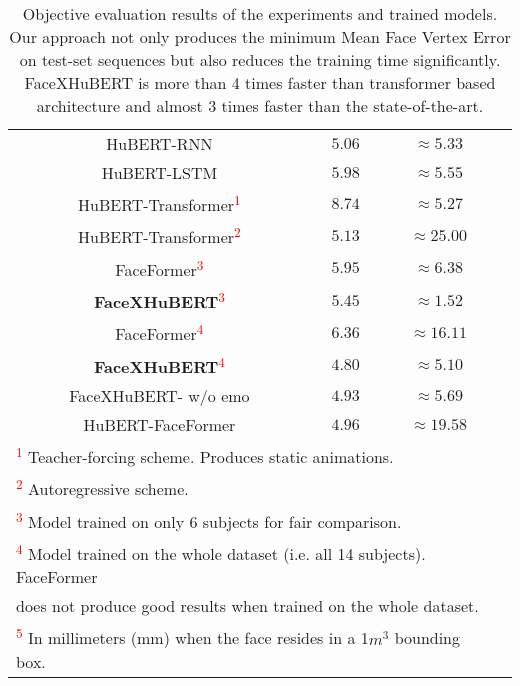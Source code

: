 \documentclass[10pt,twocolumn,letterpaper]{article}
\begin{document}
\begin{table}[t]
\begin{tabular}{c c c c}
    HuBERT-RNN & $5.06$ & $\approx5.33$\\
    HuBERT-LSTM &  $5.98$ & $\approx5.55$\\
    HuBERT-Transformer\textsuperscript{\textcolor{red}{1}} & $8.74$ & $\approx5.27$\\
    HuBERT-Transformer\textsuperscript{\textcolor{red}{2}} & $5.13$ & $\approx25.00$\\
    FaceFormer\textsuperscript{\textcolor{red}{3}} & $5.95$ & $\approx6.38$\\ \textbf{FaceXHuBERT}\textsuperscript{\textcolor{red}{3}} & $\mathbf{5.45}$ & $\mathbf{\approx1.52}$\\
    FaceFormer\textsuperscript{\textcolor{red}{4}} & $6.36$ & $\approx16.11$\\
    \textbf{FaceXHuBERT}\textsuperscript{\textcolor{red}{4}} & $\mathbf{4.80}$ & $\mathbf{\approx5.10}$\\
    FaceXHuBERT- w/o emo & $4.93$ & $\approx5.69$\\
    HuBERT-FaceFormer & $4.96$ & $\approx19.58$\\
    \bottomrule
    \multicolumn{3}{l}{\footnotesize \textsuperscript{\textcolor{red}{1}} Teacher-forcing scheme. Produces static animations.}\\
    \multicolumn{3}{l}{\footnotesize \textsuperscript{\textcolor{red}{2}} Autoregressive scheme.}\\
    \multicolumn{3}{l}{\footnotesize \textsuperscript{\textcolor{red}{3}} Model trained on only 6 subjects for fair comparison.}\\
    \multicolumn{3}{l}{\footnotesize \textsuperscript{\textcolor{red}{4}} Model trained on the whole dataset (i.e. all 14 subjects). FaceFormer }\\
    \multicolumn{3}{l}{\footnotesize does not produce good results when trained on the whole dataset.}\\
    \multicolumn{3}{l}{\footnotesize \textsuperscript{\textcolor{red}{5}} In millimeters (mm) when the face resides in a 1$m^{3}$ bounding box.}
  \end{tabular}
  \caption{Objective evaluation results of the experiments and trained models. Our approach not only produces the minimum Mean Face Vertex Error on test-set sequences but also reduces the training time significantly. FaceXHuBERT is more than 4 times faster than transformer based architecture and almost 3 times faster than the state-of-the-art.}
  \label{tab:Obj_evaluation}
  \vspace{-5mm}
\end{table}
\endgroup
\end{document}
